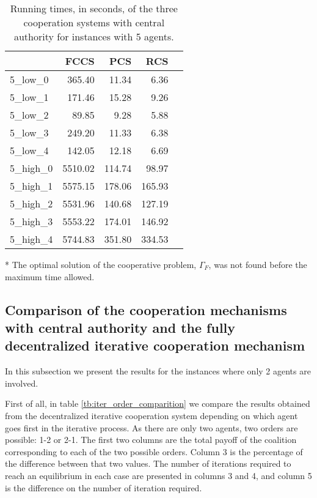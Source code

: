 \documentclass{article}
\begin{document}
\begin{table}[ht!]
\centering
\setlength{\tabcolsep}{12pt}
\caption{Running times, in seconds, of the three cooperation systems with central authority for instances with 5 agents. \label{tb:centralauthoritytimes}}
\begin{threeparttable}
\begin{tabular}{lrrrr}
\toprule
{}  &    FCCS &  PCS &  RCS \\
\midrule
5\_low\_0 &   365.40 &    11.34 &      6.36 \\
5\_low\_1 &     171.46 &    15.28 &      9.26 \\
5\_low\_2 &      89.85 &     9.28 &      5.88 \\
5\_low\_3 &      249.20 &    11.33 &      6.38 \\
5\_low\_4 &      142.05 &    12.18 &      6.69 \\
5\_high\_0 &      5510.02\tnote{*} &   114.74 &     98.97 \\
5\_high\_1 &      5575.15\tnote{*} &   178.06 &    165.93 \\
5\_high\_2 &      5531.96\tnote{*} &   140.68 &    127.19 \\
5\_high\_3 &      5553.22\tnote{*} &   174.01 &    146.92 \\
5\_high\_4 &      5744.83\tnote{*}
 &   351.80 &    334.53 \\
\bottomrule
\end{tabular}
	\begin{tablenotes}\footnotesize
		\item[*] The optimal solution of the cooperative problem, $\Gamma_F$, was not found before the maximum time allowed.
	\end{tablenotes}
\end{threeparttable}
\end{table}

\subsection{Comparison of the cooperation mechanisms with central authority and the fully decentralized iterative cooperation mechanism}
 

In this subsection we present the results for the instances where only 2 agents are involved. 

First of all, in table \ref{tb:iter_order_comparition} we compare the results obtained from the decentralized iterative cooperation system depending on which agent goes first in the iterative process. As there are only two agents, two orders are possible: 1-2 or 2-1. The first two columns are the total payoff of the coalition corresponding to each of the two possible orders. Column 3 is the percentage of the difference between that two values. The number of iterations required to reach an equilibrium in each case are presented in columns 3 and 4, and column 5 is the difference on the number of iteration required.
\end{document}
